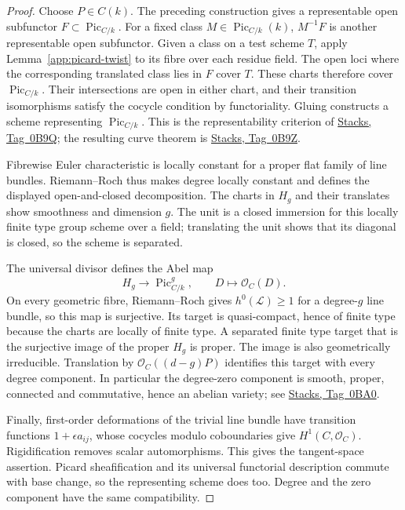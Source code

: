 \documentclass[11pt,a4paper]{article}
\numberwithin{equation}{section}
\theoremstyle{definition}
\theoremstyle{remark}
\newcommand{\stacks}[1]{\href{https://stacks.math.columbia.edu/tag/#1}{\textnormal{Stacks, Tag~#1}}}
\begin{document}
\begin{proof}
Choose $P\in C(k)$. The preceding construction gives a representable
open subfunctor $F\subset\operatorname{Pic}_{C/k}$. For a fixed class
$M\in\operatorname{Pic}_{C/k}(k)$,
$M^{-1}F$ is another representable open subfunctor. Given a class
on a test scheme $T$, apply Lemma~\ref{app:picard-twist} to its fibre
over each residue field. The open loci where the corresponding
translated class lies in $F$ cover $T$. These charts therefore
cover $\operatorname{Pic}_{C/k}$. Their intersections are open in either chart, and their
transition isomorphisms satisfy the cocycle condition by functoriality.
Gluing constructs a scheme representing $\operatorname{Pic}_{C/k}$. This is the
representability criterion of \stacks{0B9Q}; the resulting curve
theorem is \stacks{0B9Z}.

Fibrewise Euler characteristic is locally constant for a proper flat
family of line bundles. Riemann--Roch thus makes degree locally
constant and defines the displayed open-and-closed decomposition.
The charts in $H_g$ and their translates show smoothness and
dimension $g$. The unit is a closed immersion for this locally
finite type group scheme over a field; translating the unit shows
that its diagonal is closed, so the scheme is separated.

The universal divisor defines the Abel map
\[
 H_g\longrightarrow\operatorname{Pic}^g_{C/k},
 \qquad D\longmapsto\mathcal O_C(D).
\]
On every geometric fibre, Riemann--Roch gives $h^0(\mathcal L)\geq1$
for a degree-$g$ line bundle, so this map is surjective. Its target is
quasi-compact, hence of finite type because the charts are locally of
finite type. A separated finite type target that is the surjective
image of the proper $H_g$ is proper. The image is also geometrically
irreducible. Translation
by $\mathcal O_C((d-g)P)$ identifies this target with every degree
component. In particular the degree-zero component is smooth,
proper, connected and commutative, hence an abelian variety;
see \stacks{0BA0}.

Finally, first-order deformations of the trivial line bundle have
transition functions $1+\epsilon a_{ij}$, whose cocycles modulo
coboundaries give $H^1(C,\mathcal O_C)$. Rigidification removes
scalar automorphisms. This gives the tangent-space assertion.
Picard sheafification and its universal functorial description commute
with base change, so the representing scheme does too. Degree and
the zero component have the same compatibility.
\end{proof}
\end{document}
